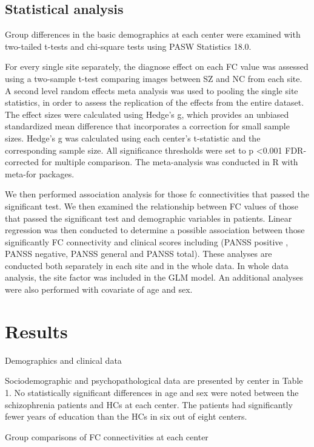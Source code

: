 \documentclass[preprint,authoryear,review,12pt,times]{elsarticle}
\begin{document}
\subsection*{Statistical analysis}

Group differences in the basic demographics at each center were examined with two-tailed t-tests and chi-square tests using PASW Statistics 18.0.

For every single site separately, the diagnose effect on each FC value was assessed using a two-sample t-test comparing images between SZ and NC from each site. A second level random effects meta analysis was used to pooling the single site statistics, in order to assess the replication of the effects from the entire dataset. The effect sizes were calculated using Hedge's g, which provides an unbiased standardized mean difference that incorporates a correction for small sample sizes. Hedge's g was calculated using each center's t-statistic and the corresponding sample size. All significance thresholds were set to p \textless 0.001 FDR-corrected for multiple comparison. The meta-analysis was conducted in R with meta-for packages.

We then performed association analysis for those fc connectivities that passed the significant test. We then examined the relationship between FC values of those that passed the significant test and demographic variables in patients.  Linear regression was then conducted to determine a possible association between those significantly FC connectivity and clinical scores including (PANSS positive , PANSS negative, PANSS general and PANSS total). These analyses are conducted both separately in each site and in the whole data. In whole data analysis, the site factor was included in the GLM model. An additional analyses were also performed with covariate of age and sex.

\section*{Results}

Demographics and clinical data

Sociodemographic and psychopathological data are presented by center in Table 1. No statistically significant differences in age and sex were noted between the schizophrenia patients and HCs at each center. The patients had significantly fewer years of education than the HCs in six out of eight centers.

Group comparisons of FC connectivities at each center
\end{document}
